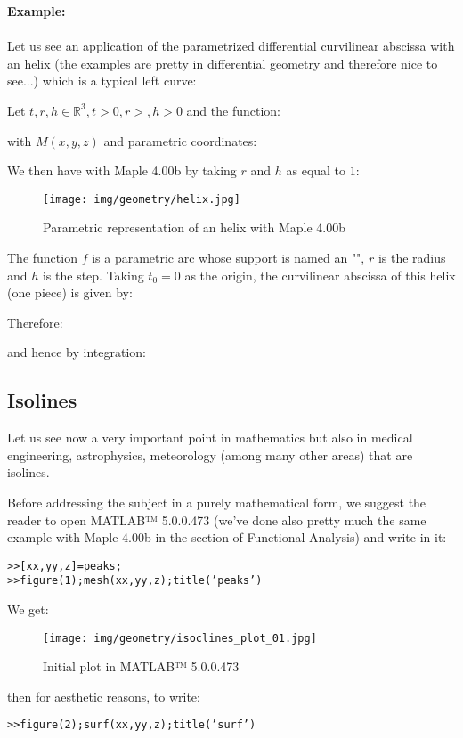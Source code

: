 {	\begin{tcolorbox}[colframe=black,colback=white,sharp corners]
	\textbf{{\Large {}}Example:}\\\\
	Let us see an application of the parametrized differential curvilinear abscissa with an helix (the examples are pretty in differential geometry and therefore nice to see...) which is a typical left curve:
	
	Let $t,r,h\in \mathbb{R}^3,t>0,r>,h>0$ and the function:
	
	with $M(x,y,z)$ and parametric coordinates:
	
	We then have with Maple 4.00b by taking $r$ and $h$ as equal to $1$:
	\begin{figure}[H]
		\centering
		\texttt{[image: img/geometry/helix.jpg]}
		\caption{Parametric representation of an helix with Maple 4.00b}
	\end{figure}
	The function $f$ is a parametric arc whose support is named an "", $r$ is the radius and $h$ is the step. Taking $t_0=0$ as the origin, the curvilinear abscissa of this helix (one piece) is given by:
	
	Therefore:
	
	and hence by integration:
	
	\end{tcolorbox}
	
	\subsection{Isolines}
	Let us see now  a very important point in mathematics but also in medical engineering, astrophysics, meteorology (among many other areas) that are isolines.
	
	Before addressing the subject in a purely mathematical form, we suggest the reader to open MATLAB™ 5.0.0.473 (we've done also pretty much the same example with Maple 4.00b in the section of Functional Analysis) and write in it:
	
	\texttt{>>[xx,yy,z]=peaks;\\
	>>figure(1);mesh(xx,yy,z);title('peaks')}
	
	We get:
	\begin{figure}[H]
		\centering
		\texttt{[image: img/geometry/isoclines\_plot\_01.jpg]}
		\caption[]{Initial plot in MATLAB™ 5.0.0.473}
	\end{figure}
	then for aesthetic reasons, to write:
	
	\texttt{>>figure(2);surf(xx,yy,z);title('surf')}
	
}
